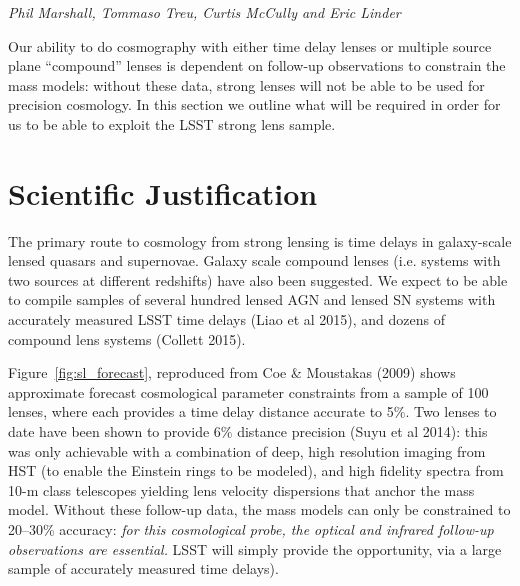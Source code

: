 

\label{chap:sl}

{\it Phil Marshall, Tommaso Treu, Curtis McCully and Eric Linder}


Our ability to do cosmography with either time delay lenses or multiple
source plane ``compound'' lenses is dependent on follow-up observations
to constrain the mass models: without these data, strong lenses will not
be able to be used for precision cosmology. In this section we outline what will be
required in order for us to be able to exploit the LSST strong lens sample.


\section{Scientific Justification}
\label{sec:sl_just}

The primary route to cosmology from strong lensing is time delays in
galaxy-scale lensed quasars and supernovae. Galaxy scale compound lenses
(i.e. systems with two sources at different redshifts) have also been
suggested. We expect to be able to compile samples of several hundred lensed AGN
and lensed SN systems with accurately measured LSST time delays (Liao et al 2015),
and dozens of compound lens systems (Collett 2015).

Figure~\ref{fig:sl_forecast}, reproduced from Coe \& Moustakas (2009)
shows approximate forecast cosmological  parameter constraints from a
sample of 100 lenses, where each provides a  time delay distance
accurate to 5\%. Two lenses to date have been  shown to provide 6\%
distance precision (Suyu et al 2014): this was only  achievable with a
combination of deep, high resolution imaging from HST (to enable the
Einstein rings to be modeled), and high fidelity spectra from 10-m class
telescopes yielding lens velocity dispersions that anchor the mass
model. Without these follow-up data, the mass models can only be
constrained to 20--30\% accuracy: {\it for this cosmological probe, the
optical and infrared follow-up observations are essential.} LSST will
simply provide the opportunity, via a large sample of accurately
measured time delays).



